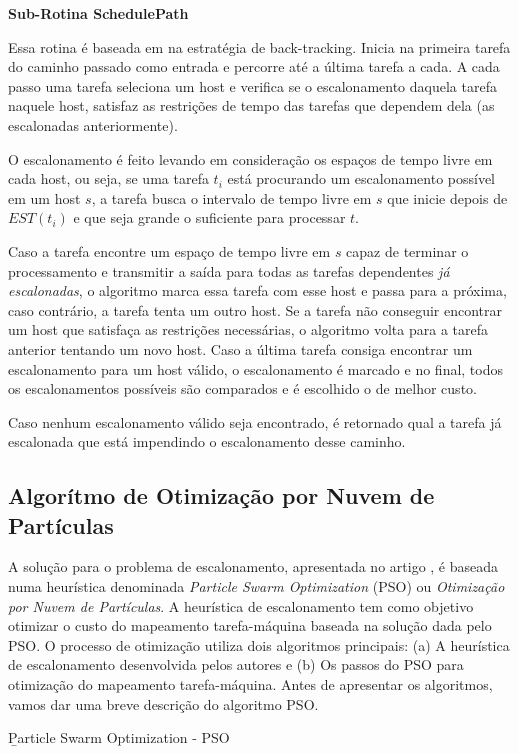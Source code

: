 \documentclass[a4paper,10pt]{article}
\begin{document}
\textbf{Sub-Rotina SchedulePath}

Essa rotina é baseada em na estratégia de back-tracking. Inicia na primeira tarefa do caminho passado como entrada e percorre até a última tarefa a cada. A cada passo uma tarefa seleciona um host e verifica se o escalonamento daquela tarefa naquele host, satisfaz as restrições de tempo das tarefas que dependem dela (as escalonadas anteriormente).

O escalonamento é feito levando em consideração os espaços de tempo livre em cada host, ou seja, se uma tarefa $t_{i}$ está procurando um escalonamento possível em um host $s$, a tarefa busca o intervalo de tempo livre em $s$ que inicie depois de $EST(t_{i})$ e que seja grande o suficiente para processar $t$.

Caso a tarefa encontre um espaço de tempo livre em $s$ capaz de terminar o processamento e transmitir a saída para todas as tarefas dependentes \emph{já escalonadas}, o algoritmo marca essa tarefa com esse host e passa para a próxima, caso contrário, a tarefa tenta um outro host. Se a tarefa não conseguir encontrar um host que satisfaça as restrições necessárias, o algoritmo volta para a tarefa anterior tentando um novo host. Caso a última tarefa consiga encontrar um escalonamento para um host válido, o escalonamento é marcado e no final, todos os escalonamentos possíveis são comparados e é escolhido o de melhor custo.

Caso nenhum escalonamento válido seja encontrado, é retornado qual a tarefa já escalonada que está impendindo o escalonamento desse caminho.

\subsection{Algorítmo de Otimização por Nuvem de Partículas}
\label{psoalgo}
A solução para o problema de escalonamento, apresentada no artigo \cite{pso_a}, é baseada numa heurística 
denominada \emph{Particle Swarm Optimization} (PSO) ou \emph{Otimização por Nuvem de Partículas}. A heurística de 
escalonamento tem como objetivo otimizar 
o custo do mapeamento tarefa-máquina baseada na solução dada pelo PSO. O processo de otimização utiliza 
dois algoritmos principais: (a) A heurística de escalonamento desenvolvida pelos autores e (b) Os passos do PSO 
para otimização do mapeamento tarefa-máquina. Antes de apresentar os algoritmos, vamos 
dar uma breve descrição do algoritmo PSO.

\b{Particle Swarm Optimization - PSO}
\end{document}
